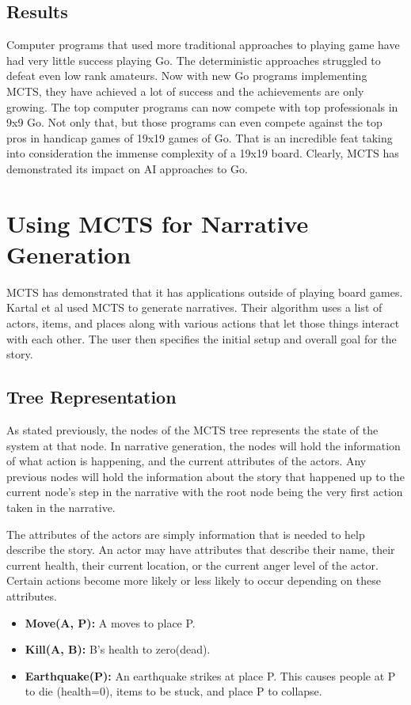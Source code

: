 \documentclass{sig-alternate}
\begin{document}
\subsection{Results}
Computer programs that used more traditional approaches to playing game have had very little success playing Go. The deterministic approaches struggled to defeat even low rank amateurs. Now with new Go programs implementing MCTS, they have achieved a lot of success and the achievements are only growing. The top computer programs can now compete with top professionals in 9x9 Go\cite{RAVEinGo}. Not only that, but those programs can even compete against the top pros in handicap games of 19x19 games of Go. That is an incredible feat taking into consideration the immense complexity of a 19x19 board. Clearly, MCTS has demonstrated its impact on AI approaches to Go.

\section{Using MCTS for Narrative Generation}
MCTS has demonstrated that it has applications outside of playing board games. Kartal et al\cite{Narrative} used MCTS to generate narratives. Their algorithm uses a list of actors, items, and places along with various actions that let those things interact with each other. The user then specifies the initial setup and overall goal for the story.

\subsection{Tree Representation}
As stated previously, the nodes of the MCTS tree represents the state of the system at that node. In narrative generation, the nodes will hold the information of what action is happening, and the current attributes of the actors. Any previous nodes will hold the information about the story that happened up to the current node's step in the narrative with the root node being the very first action taken in the narrative.

The attributes of the actors are simply information that is needed to help describe the story. An actor may have attributes that describe their name, their current health, their current location, or the  current anger level of the actor. Certain actions become more likely or less likely to occur depending on these attributes.

\begin{itemize}
\item \textbf{Move(A, P):} A moves to place P.
\item \textbf{Kill(A, B):} B's health to zero(dead).
\item \textbf{Earthquake(P):} An earthquake strikes at place P. This causes people at P to die (health=0), items to be stuck, and place P to collapse.
\end{itemize}
\end{document}
